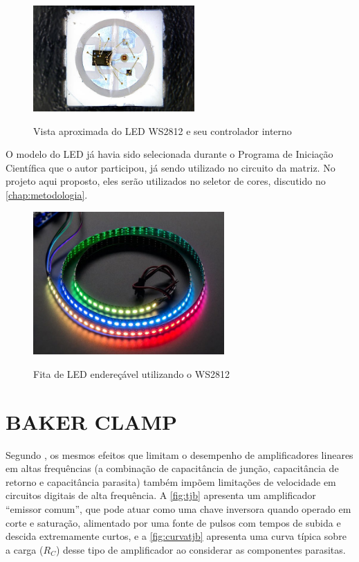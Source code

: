 \begin{figure}[!htb]
    \centering
    \caption{Vista aproximada do LED WS2812 e seu controlador interno}
    \includegraphics[width=0.55\textwidth]{./dados/figuras/ws2812}
    \label{fig:ws2812}
\end{figure}

O modelo do LED já havia sido selecionada durante o Programa de Iniciação Científica que o autor participou, já sendo utilizado no circuito da matriz. No projeto aqui proposto, eles serão utilizados no seletor de cores, discutido no \autoref{chap:metodologia}.

\begin{figure}[H]
    \centering
    \caption{Fita de LED endereçável utilizando o WS2812}
    \includegraphics[width=0.65\textwidth]{./dados/figuras/strip}
    \label{fig:strip}
\end{figure}

\section{BAKER CLAMP}
\label{sec:backerclamp}

Segundo , os mesmos efeitos que limitam o desempenho de amplificadores lineares em altas frequências (a combinação de capacitância de junção, capacitância de retorno e capacitância parasita) também impõem limitações de velocidade em circuitos digitais de alta frequência. A \autoref{fig:tjb} apresenta um amplificador ``emissor comum'', que pode atuar como uma chave inversora quando operado em corte e saturação, alimentado por uma fonte de pulsos com tempos de subida e descida extremamente curtos, e a \autoref{fig:curvatjb} apresenta uma curva típica sobre a carga ($R_{C}$) desse tipo de amplificador ao considerar as componentes parasitas. 

